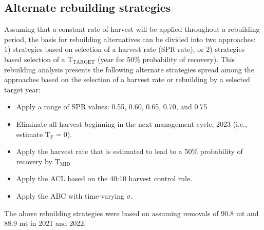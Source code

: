 \documentclass[11pt,
  english,
  a4paper,
]{article}
\begin{document}
\leavevmode\tagmcend\tagstructend\par


\hypertarget{alternate-rebuilding-strategies}{%
\subsection{Alternate rebuilding strategies}\label{alternate-rebuilding-strategies}}

\leavevmode\tagmcend\tagstructend


Assuming that a constant rate of harvest will be applied throughout a rebuilding period, the basis for rebuilding alternatives can be divided into two approaches: 1) strategies based on selection of a harvest rate (SPR rate), or 2) strategies based selection of a {\(\text{T}_\text{TARGET}\)\leavevmode\tagmcend\tagstructend} (year for 50\% probability of recovery). This rebuilding analysis presents the following alternate strategies spread among the approaches based on the selection of a harvest rate or rebuilding by a selected target year:

\leavevmode\tagmcend\tagstructend\par

\begin{itemize}
    \item Apply a range of SPR values: 0.55, 0.60, 0.65, 0.70, and 0.75 
    \item Eliminate all harvest beginning in the next management cycle, 2023 (i.e., estimate $\text{T}_\text{F} = 0$).
    \item Apply the harvest rate that is estimated to lead to a 50$\%$ probability of recovery by $\text{T}_\text{MID}$ 
    \item Apply the ACL based on the 40:10 harvest control rule.
    \item Apply the ABC with time-varying $\sigma$.
\end{itemize}


The above rebuilding strategies were based on assuming removals of 90.8 mt and 88.9 mt in 2021 and 2022.

\leavevmode\tagmcend\tagstructend\par

\end{document}
